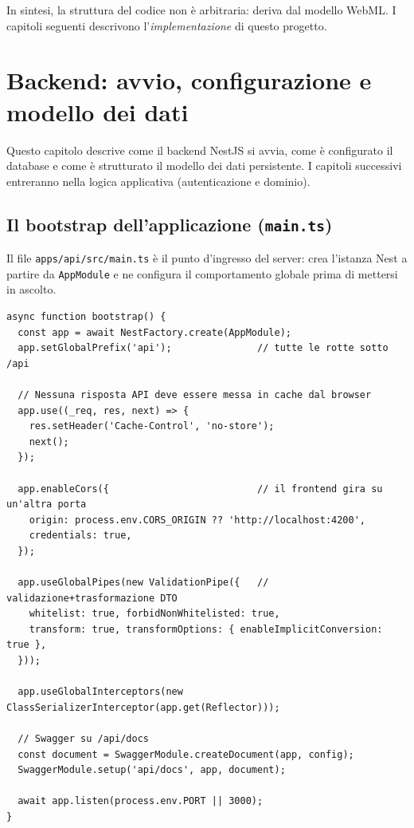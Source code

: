 \documentclass[11pt,a4paper,oneside]{report}
\newcommand{\code}[1]{\texttt{\small #1}}
\newcommand{\file}[1]{\texttt{\small #1}}
\begin{document}
In sintesi, la struttura del codice non è arbitraria: deriva dal modello WebML.
I capitoli seguenti descrivono l'\emph{implementazione} di questo progetto.

\chapter{Backend: avvio, configurazione e modello dei dati}
\label{cap:backend}

Questo capitolo descrive come il backend NestJS si avvia, come è configurato il
database e come è strutturato il modello dei dati persistente. I capitoli
successivi entreranno nella logica applicativa (autenticazione e dominio).

\section{Il bootstrap dell'applicazione (\texttt{main.ts})}
Il file \file{apps/api/src/main.ts} è il punto d'ingresso del server: crea
l'istanza Nest a partire da \code{AppModule} e ne configura il comportamento
globale prima di mettersi in ascolto.

\begin{lstlisting}[caption={Estratto di \file{apps/api/src/main.ts}.}]
async function bootstrap() {
  const app = await NestFactory.create(AppModule);
  app.setGlobalPrefix('api');               // tutte le rotte sotto /api

  // Nessuna risposta API deve essere messa in cache dal browser
  app.use((_req, res, next) => {
    res.setHeader('Cache-Control', 'no-store');
    next();
  });

  app.enableCors({                          // il frontend gira su un'altra porta
    origin: process.env.CORS_ORIGIN ?? 'http://localhost:4200',
    credentials: true,
  });

  app.useGlobalPipes(new ValidationPipe({   // validazione+trasformazione DTO
    whitelist: true, forbidNonWhitelisted: true,
    transform: true, transformOptions: { enableImplicitConversion: true },
  }));

  app.useGlobalInterceptors(new ClassSerializerInterceptor(app.get(Reflector)));

  // Swagger su /api/docs
  const document = SwaggerModule.createDocument(app, config);
  SwaggerModule.setup('api/docs', app, document);

  await app.listen(process.env.PORT || 3000);
}
\end{lstlisting}
\end{document}
